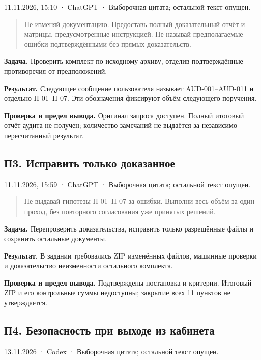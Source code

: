 \documentclass[11pt,a4paper]{article}
\newcommand{\source}[1]{{\small\color{muted}#1\par}}
\begin{document}
\source{11.11.2026, 15:10 · ChatGPT · Выборочная цитата; остальной текст опущен.}

\begin{quote}\small Не изменяй документацию. Предоставь полный доказательный отчёт и матрицы, предусмотренные инструкцией. Не называй предполагаемые ошибки подтверждёнными без прямых доказательств.\end{quote}

\textbf{Задача.} Проверить комплект по исходному архиву, отделив подтверждённые противоречия от предположений.


\textbf{Результат.} Следующее сообщение пользователя называет AUD-001–AUD-011 и отдельно H-01–H-07. Эти обозначения фиксируют объём следующего поручения.


\textbf{Проверка и предел вывода.} Оригинал запроса доступен. Полный итоговый отчёт аудита не получен; количество замечаний не выдаётся за независимо пересчитанный результат.


\clearpage

\subsection{П3. Исправить только доказанное}

\source{11.11.2026, 15:59 · ChatGPT · Выборочная цитата; остальной текст опущен.}

\begin{quote}\small Не выдавай гипотезы H-01–H-07 за ошибки. Выполни весь объём за один проход, без повторного согласования уже принятых решений.\end{quote}

\textbf{Задача.} Перепроверить доказательства, исправить только разрешённые файлы и сохранить остальные документы.


\textbf{Результат.} В задании требовались ZIP изменённых файлов, машинные проверки и доказательство неизменности остального комплекта.


\textbf{Проверка и предел вывода.} Подтверждены постановка и критерии. Итоговый ZIP и его контрольные суммы недоступны; закрытие всех 11 пунктов не утверждается.


\subsection{П4. Безопасность при выходе из кабинета}

\source{13.11.2026 · Codex · Выборочная цитата; остальной текст опущен.}
\end{document}
